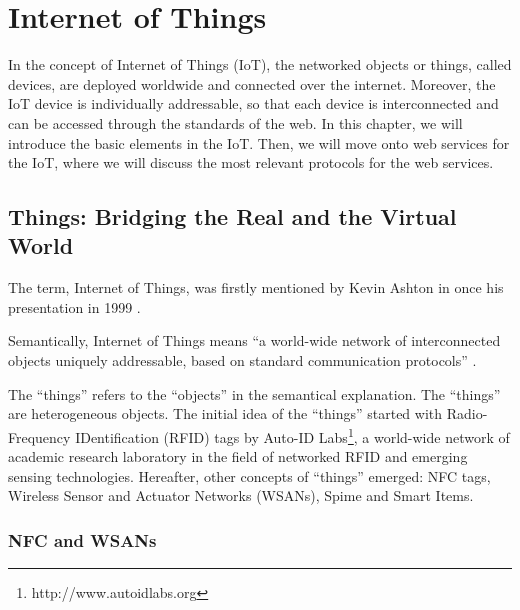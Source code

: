\chapter{Internet of Things}
\label{chapter:internetofthings} 

In the concept of Internet of Things (IoT), the networked objects or things, called devices, are deployed worldwide and connected over the internet. Moreover, the IoT device is individually addressable, so that each device is interconnected and can be accessed through the standards of the web. In this chapter, we will introduce the basic elements in the IoT. Then, we will move onto web services for the IoT, where we will discuss the most relevant protocols for the web services.

\section{Things: Bridging the Real and the Virtual World}

The term, Internet of Things, was firstly mentioned by Kevin Ashton in once his presentation in 1999 \cite{ashton2009internet}.

Semantically, Internet of Things means ``a world-wide network of interconnected objects uniquely addressable, based on standard communication protocols'' \cite{infso2008networked}. 

The ``things'' refers to the ``objects'' in the semantical explanation. The ``things'' are heterogeneous objects. The initial idea of the ``things'' started with Radio-Frequency IDentification (RFID) tags by Auto-ID Labs\footnote{http://www.autoidlabs.org}, a world-wide network of academic research laboratory in the field of networked RFID and emerging sensing technologies. Hereafter, other concepts of ``things'' emerged: NFC tags, Wireless Sensor and Actuator Networks (WSANs), Spime and Smart Items.

\subsection{NFC and WSANs}

